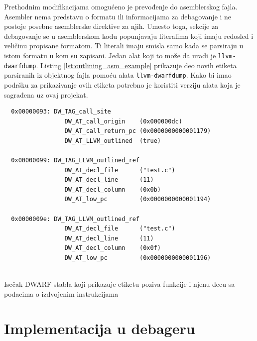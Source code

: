 \documentclass[12pt,oneside]{memoir}
\begin{document}
Prethodnim modifikacijama omogućeno je prevođenje do asemblerskog fajla.
Asembler nema predstavu o formatu ili informacijama za debagovanje i ne postoje posebne asemblerske direktive za njih.
Umesto toga, sekcije za debagovanje se u asemblerskom kodu popunjavaju literalima koji imaju redosled i veličinu propisane formatom.
Ti literali imaju smisla samo kada se parsiraju u istom formatu u kom su zapisani.
Jedan alat koji to može da uradi je \verb|llvm-dwarfdump|.
Listing \ref{lst:outlining_asm_example} prikazuje deo novih etiketa parsiranih iz objektnog fajla pomoću alata \verb|llvm-dwarfdump|.
Kako bi imao podršku za prikazivanje ovih etiketa potrebno je koristiti verziju alata koja je sagrađena uz ovaj projekat.

\begin{listing}[!ht]
\begin{verbatim}
  0x00000093: DW_TAG_call_site
                 DW_AT_call_origin    (0x000000dc)
                 DW_AT_call_return_pc (0x0000000000001179)
                 DW_AT_LLVM_outlined  (true)
  
  0x00000099: DW_TAG_LLVM_outlined_ref
                 DW_AT_decl_file      ("test.c")
                 DW_AT_decl_line      (11)
                 DW_AT_decl_column    (0x0b)
                 DW_AT_low_pc         (0x0000000000001194)
  
  0x0000009e: DW_TAG_LLVM_outlined_ref
                 DW_AT_decl_file      ("test.c")
                 DW_AT_decl_line      (11)
                 DW_AT_decl_column    (0x0f)
                 DW_AT_low_pc         (0x0000000000001196)
  
  \end{verbatim}
  \caption{Isečak DWARF stabla koji prikazuje etiketu poziva funkcije i njenu decu sa podacima o izdvojenim instrukcijama}
  \label{lst:outlining_asm_example}
\end{listing}

\section{Implementacija u debageru}

\label{sec:debugger_implementation}
\end{document}
